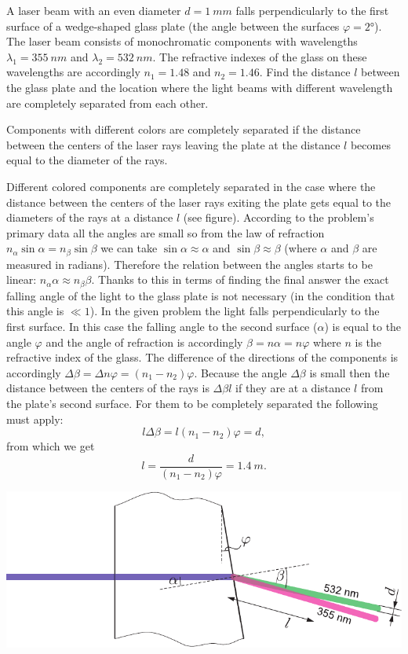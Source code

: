 {\ifEngStatement
A laser beam with an even diameter $d=\SI{1}{mm}$ falls perpendicularly to the first surface of a wedge-shaped glass plate (the angle between the surfaces $\varphi=\ang{2}$). The laser beam consists of monochromatic components with wavelengths $\lambda_1=\SI{355}{nm}$ and $\lambda_2=\SI{532}{nm}$. The refractive indexes of the glass on these wavelengths are accordingly $n_1=\num{1.48}$ and $n_2=\num{1.46}$. Find the distance $l$ between the glass plate and the location where the light beams with different wavelength are completely separated from each other.
\fi


\ifEngHint
Components with different colors are completely separated if the distance between the centers of the laser rays leaving the plate at the distance $l$ becomes equal to the diameter of the rays.
\fi


\ifEngSolution
Different colored components are completely separated in the case where the distance between the centers of the laser rays exiting the plate gets equal to the diameters of the rays at a distance $l$ (see figure). According to the problem’s primary data all the angles are small so from the law of refraction $n_\alpha\sin\alpha=n_\beta\sin\beta$ we can take $\sin\alpha\approx\alpha$ and $\sin\beta\approx\beta$ (where $\alpha$ and $\beta$ are measured in radians). Therefore the relation between the angles starts to be linear: $n_\alpha\alpha\approx n_\beta\beta$. Thanks to this in terms of finding the final answer the exact falling angle of the light to the glass plate is not necessary (in the condition that this angle is $\ll 1$). In the given problem the light falls perpendicularly to the first surface. In this case the falling angle to the second surface ($\alpha$) is equal to the angle $\varphi$ and the angle of refraction is accordingly $\beta=n\alpha=n\varphi$ where $n$ is the refractive index of the glass. The difference of the directions of the components is accordingly $\Delta\beta=\Delta n\varphi=(n_1-n_2)\varphi$. Because the angle $\Delta\beta$ is small then the distance between the centers of the rays is $\Delta\beta l$ if they are at a distance $l$ from the plate’s second surface. For them to be completely separated the following must apply:
\[
l\Delta\beta=l(n_1-n_2)\varphi=d,
\]
from which we get
\[
l = \frac{d}{(n_1-n_2)\varphi} = \SI{1.4}{m}.
\]
\begin{center}
	\includegraphics[width=0.93\linewidth]{2017-v3g-03-laser-lahend}
\end{center}
\fi
}